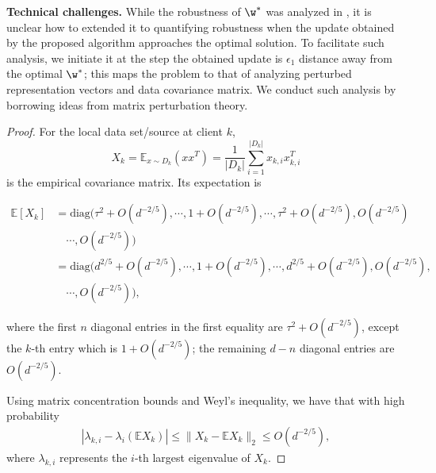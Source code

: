 \documentclass[a4paper,11pt]{article}
\begin{document}
{\textbf{Technical challenges.}}
While the robustness of $\w^*$ was analyzed in \cite{wang2022does}, it is unclear how to extended it to quantifying robustness when the update obtained by the proposed algorithm approaches the optimal solution. To facilitate such analysis, we initiate it at the step the obtained update is $\epsilon_1$ distance away from the optimal $\w^*$; this maps the problem to that of analyzing perturbed representation vectors and data covariance matrix. We conduct such analysis by borrowing ideas from matrix perturbation theory. 

\begin{proof}
For the local data set/source at client $k$, 
\[
X_k = \mathbb{E}_{x \sim D_k}(xx^T) = \frac{1}{|D_k|}\sum_{i=1}^{|D_k|} x_{k, i}x_{k, i}^T
\]
is the empirical covariance matrix. Its expectation is
\begin{small}
\begin{equation}
\begin{aligned}
    \mathbb{E}[X_k] & = \mathrm{diag}(\tau^2 + O(d^{-2/5}), \cdots, 1+O(d^{-2/5}), \cdots, \tau^2 + O(d^{-2/5}),  O(d^{-2/5}) \\
    & \quad \cdots,  O(d^{-2/5}) ) \\
    & = \mathrm{diag}( d^{2/5}+O(d^{-2/5}), \cdots, 1+O(d^{-2/5}), \cdots, d^{2/5}+O(d^{-2/5}), O(d^{-2/5}), \\ 
    & \quad \cdots, O(d^{-2/5})  ), \label{eq:r1}
\end{aligned}
\end{equation}
\end{small}
where the first $n$ diagonal entries in the first equality are $ \tau^2+ O(d^{-2/5})$, except the $k$-th entry which is $ 1+ O(d^{-2/5})$; the remaining $d-n$ diagonal entries are $ O(d^{-2/5})$.

Using matrix concentration bounds \cite{vershynin2018high} and Weyl's inequality, we have that with high probability 
\begin{align}\label{eq:r2}
    |\lambda_{k, i} - \lambda_i(\mathbb{E}X_k)| \leq \|X_k - \mathbb{E}X_k \|_2 \leq O(d^{-2/5}),
\end{align}
where $\lambda_{k, i}$ represents the $i$-th largest eigenvalue of $X_k$.


\end{proof}
\end{document}
